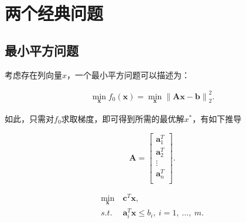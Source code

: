 \section{两个经典问题}

\subsection{最小平方问题}
\label{c1:minsquare}

考虑存在列向量$x$，一个最小平方问题可以描述为：

\begin{problem}[最简的最小平方问题] \label{def:c1:minsquare}
	\begin{align} \label{fml:c1:minsquare}
		\min\limits_{\mathbf{x}} f_0(\mathbf{x}) = \min\limits_{\mathbf{x}} {\lVert \mathbf{A}\mathbf{x} - \mathbf{b} \rVert}^2_2.
	\end{align}
\end{problem}

如此，只需对$f_0$求取梯度，即可得到所需的最优解$x^{\ast}$，有如下推导

\begin{equation}\label{fml:c1:reviseA}
	\mathbf{A} = \left[
	\begin{array}{c}
		 \mathbf{a}^T_1 \\
		 \mathbf{a}^T_2 \\
		 \vdots \\
		 \mathbf{a}^T_n \\
	\end{array}
	\right].
\end{equation}

\begin{problem}[较一般的线性规划问题] \label{def:c1:minlinear}
	\begin{subequations}
		\renewcommand{\theequation}
		{\theparentequation-\arabic{equation}}
		\begin{align}
		\min\limits_{\mathbf{x}}~&\mathbf{c}^T\mathbf{x},\label{fml:c1:minlinear}\\ 
		s.t.~&\mathbf{a}_i^T\mathbf{x} \leqslant b_i,~i=1,~\ldots,~m. \label{fml:c1:minlinearconst}
		\end{align}
	\end{subequations}
\end{problem}
